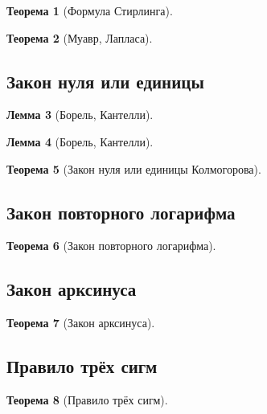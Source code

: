 \documentclass[12pt]{article}
\newtheorem{theorem}{Теорема}
\newtheorem{lemma}[theorem]{Лемма}
\numberwithin{theorem}{section}
\theoremstyle{definition}
\begin{document}
	\begin{theorem}[Формула Стирлинга]
		
	\end{theorem}
	
	\begin{theorem}[Муавр, Лапласа]
		
	\end{theorem}
	
	\subsection{Закон нуля или единицы}
	
	\begin{lemma}[Борель, Кантелли]
		
	\end{lemma}
	
	\begin{lemma}[Борель, Кантелли]
		
	\end{lemma}
	
	\begin{theorem}[Закон нуля или единицы Колмогорова]
		
	\end{theorem}
	
	\subsection{Закон повторного логарифма}
	
	\begin{theorem}[Закон повторного логарифма]
		
	\end{theorem}
	
	\subsection{Закон арксинуса}
	
	\begin{theorem}[Закон арксинуса]
		
	\end{theorem}
	
	\subsection{Правило трёх сигм}
	
	\begin{theorem}[Правило трёх сигм]
		
	\end{theorem}
	
\end{document}
